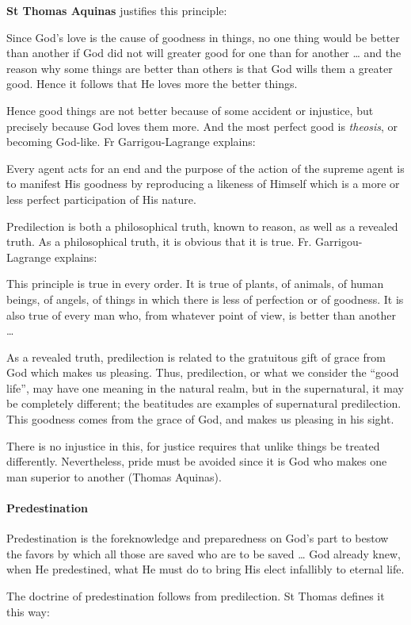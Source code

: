 \textbf{St Thomas Aquinas} justifies this principle:

\begin{quotex}
Since God's love is the cause of goodness in things, no one thing would be better than another if God did not will greater good for one than for another … and the reason why some things are better than others is that God wills them a greater good. Hence it follows that He loves more the better things.

\end{quotex}
Hence good things are not better because of some accident or injustice, but precisely because God loves them more. And the most perfect good is \emph{theosis}, or becoming God-like. Fr Garrigou-Lagrange explains:

\begin{quotex}
Every agent acts for an end and the purpose of the action of the supreme agent is to manifest His goodness by reproducing a likeness of Himself which is a more or less perfect participation of His nature.

\end{quotex}
Predilection is both a philosophical truth, known to reason, as well as a revealed truth. As a philosophical truth, it is obvious that it is true. Fr. Garrigou-Lagrange explains:

\begin{quotex}
This principle is true in every order. It is true of plants, of animals, of human beings, of angels, of things in which there is less of perfection or of goodness. It is also true of every man who, from whatever point of view, is better than another …

\end{quotex}
As a revealed truth, predilection is related to the gratuitous gift of grace from God which makes us pleasing. Thus, predilection, or what we consider the “good life”, may have one meaning in the natural realm, but in the supernatural, it may be completely different; the beatitudes are examples of supernatural predilection. This goodness comes from the grace of God, and makes us pleasing in his sight.

There is no injustice in this, for justice requires that unlike things be treated differently. Nevertheless, pride must be avoided since it is God who makes one man superior to another (Thomas Aquinas).

\paragraph{Predestination}
\begin{quotex}
Predestination is the foreknowledge and preparedness on God's part to bestow the favors by which all those are saved who are to be saved … God already knew, when He predestined, what He must do to bring His elect infallibly to eternal life. 
\end{quotex}
The doctrine of predestination follows from predilection. St Thomas defines it this way:

